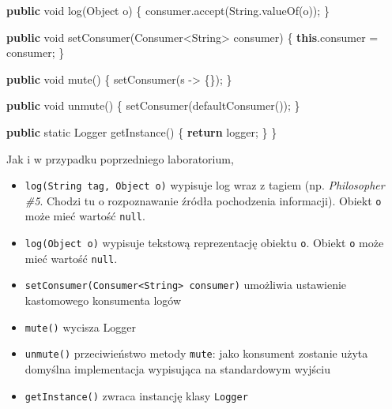 \documentclass[11pt]{article}
\providecommand{\tightlist}{%
      \setlength{\itemsep}{0pt}\setlength{\parskip}{0pt}}
\newenvironment{Shaded}{}{}
\newcommand{\KeywordTok}[1]{\textcolor[rgb]{0.00,0.44,0.13}{\textbf{{#1}}}}
\newcommand{\DataTypeTok}[1]{\textcolor[rgb]{0.56,0.13,0.00}{{#1}}}
\newcommand{\FunctionTok}[1]{\textcolor[rgb]{0.02,0.16,0.49}{{#1}}}
\newcommand{\NormalTok}[1]{{#1}}
\newcommand{\ControlFlowTok}[1]{\textcolor[rgb]{0.00,0.44,0.13}{\textbf{{#1}}}}
\newcommand{\OperatorTok}[1]{\textcolor[rgb]{0.40,0.40,0.40}{{#1}}}
\newcommand{\BuiltInTok}[1]{{#1}}
\begin{document}
\begin{Shaded}
\begin{Highlighting}[]
    \KeywordTok{public} \DataTypeTok{void} \FunctionTok{log}\OperatorTok{(}\BuiltInTok{Object}\NormalTok{ o}\OperatorTok{)} \OperatorTok{\{}
\NormalTok{        consumer}\OperatorTok{.}\FunctionTok{accept}\OperatorTok{(}\BuiltInTok{String}\OperatorTok{.}\FunctionTok{valueOf}\OperatorTok{(}\NormalTok{o}\OperatorTok{));}
    \OperatorTok{\}}

    \KeywordTok{public} \DataTypeTok{void} \FunctionTok{setConsumer}\OperatorTok{(}\NormalTok{Consumer}\OperatorTok{\textless{}}\BuiltInTok{String}\OperatorTok{\textgreater{}}\NormalTok{ consumer}\OperatorTok{)} \OperatorTok{\{}
        \KeywordTok{this}\OperatorTok{.}\FunctionTok{consumer} \OperatorTok{=}\NormalTok{ consumer}\OperatorTok{;}
    \OperatorTok{\}}

    \KeywordTok{public} \DataTypeTok{void} \FunctionTok{mute}\OperatorTok{()} \OperatorTok{\{}
        \FunctionTok{setConsumer}\OperatorTok{(}\NormalTok{s }\OperatorTok{{-}\textgreater{}} \OperatorTok{\{\});}
    \OperatorTok{\}}

    \KeywordTok{public} \DataTypeTok{void} \FunctionTok{unmute}\OperatorTok{()} \OperatorTok{\{}
        \FunctionTok{setConsumer}\OperatorTok{(}\FunctionTok{defaultConsumer}\OperatorTok{());}
    \OperatorTok{\}}

    \KeywordTok{public} \DataTypeTok{static} \BuiltInTok{Logger} \FunctionTok{getInstance}\OperatorTok{()} \OperatorTok{\{}
        \ControlFlowTok{return}\NormalTok{ logger}\OperatorTok{;}
    \OperatorTok{\}}
\OperatorTok{\}}
\end{Highlighting}
\end{Shaded}

Jak i w przypadku poprzedniego laboratorium,

\begin{itemize}
\tightlist
\item
  \texttt{log(String\ tag,\ Object\ o)} wypisuje log wraz z tagiem (np.
  \emph{Philosopher \#5}. Chodzi tu o rozpoznawanie źródła pochodzenia
  informacji). Obiekt \texttt{o} może mieć wartość \texttt{null}.
\item
  \texttt{log(Object\ o)} wypisuje tekstową reprezentację obiektu
  \texttt{o}. Obiekt \texttt{o} może mieć wartość \texttt{null}.
\item
  \texttt{setConsumer(Consumer\textless{}String\textgreater{}\ consumer)}
  umożliwia ustawienie kastomowego konsumenta logów
\item
  \texttt{mute()} wycisza Logger
\item
  \texttt{unmute()} przeciwieństwo metody \texttt{mute}: jako konsument
  zostanie użyta domyślna implementacja wypisująca na standardowym
  wyjściu
\item
  \texttt{getInstance()} zwraca instancję klasy \texttt{Logger}
\end{itemize}
\end{document}
